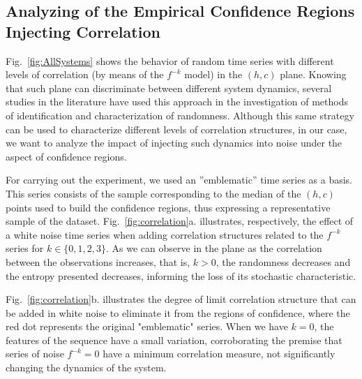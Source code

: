 \subsection{Analyzing of the Empirical Confidence Regions Injecting Correlation}

Fig.~\ref{fig:AllSystems} shows the behavior of random time series with different levels of correlation (by means of the $f^{-k}$ model) in the $(h,c)$ plane.
Knowing that such plane can discriminate between different system dynamics, several studies in the literature have used this approach in the investigation of methods of identification and characterization of randomness.
Although this same strategy can be used to characterize different levels of correlation structures, in our case, we want to analyze the impact of injecting such dynamics into noise under the aspect of confidence regions.

For carrying out the experiment, we used an ''emblematic'' time series as a basis.
This series consists of the sample corresponding to the median of the $(h,c)$ points used to build the confidence regions, thus expressing a representative sample of the dataset.
Fig.~\ref{fig:correlation}a. illustrates, respectively, the effect of a white noise time series when adding correlation structures related to the $f^{-k}$ series for $k \in \{0, 1, 2, 3 \}$.
As we can observe in the plane as the correlation between the observations increases, that is, $k > 0$, the randomness decreases and the entropy presented decreases, informing the loss of its stochastic characteristic.

Fig.~\ref{fig:correlation}b. illustrates the degree of limit correlation structure that can be added in white noise to eliminate it from the regions of confidence, where the red dot represents the original "emblematic" series.
When we have $k = 0$, the features of the sequence have a small variation, corroborating the premise that series of noise $f^{-k} = 0$ have a minimum correlation measure, not significantly changing the dynamics of the system.

